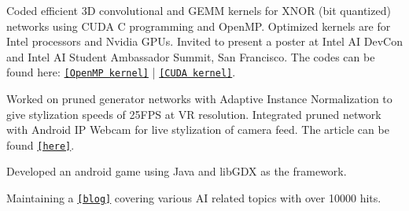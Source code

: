 \documentclass[]{deedy-resume-openfont}
\begin{document}
Coded efficient 3D convolutional and GEMM kernels for XNOR (bit quantized) networks using CUDA C programming and OpenMP. Optimized kernels are for Intel processors and Nvidia GPUs. Invited to present a poster at Intel AI DevCon and Intel AI Student Ambassador Summit, San Francisco. The codes can be found here: \href{https://github.com/akhauriyash/XNOR-Intel-ISA}{\texttt{[OpenMP kernel]}} | \href{https://github.com/akhauriyash/XNOR-convolution}{\texttt{[CUDA kernel]}}.\\
\sectionsep


Worked on pruned generator networks with Adaptive Instance Normalization to give stylization speeds of 25FPS at VR resolution. Integrated pruned network with Android IP Webcam for live stylization of camera feed. The article can be found \href{https://software.intel.com/content/www/us/en/develop/articles/art-em-artistic-style-transfer-to-virtual-reality-final-update.html}{\texttt{[here]}}. 
\sectionsep

Developed an android game using Java and libGDX as the framework. \\
\sectionsep

Maintaining a \href{https://quirkyai.wordpress.com}{\texttt{[blog]}} covering various AI   related topics with over 10000 hits. \\
\sectionsep


\end{document}

